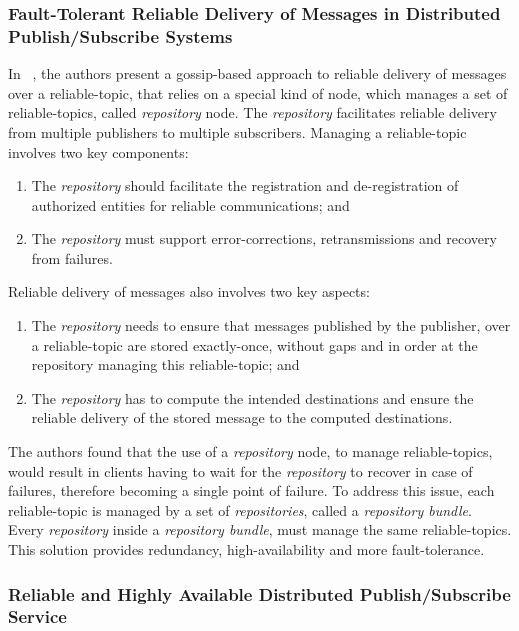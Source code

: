 \subsubsection{Fault-Tolerant Reliable Delivery of Messages in Distributed Publish/Subscribe Systems}
\label{sec:fault_tolerant_reliable_delivery}

In ~\cite{repository-nodes}, the authors present a gossip-based approach to reliable delivery of messages over a reliable-topic, that relies on a special kind of node, which manages a set of reliable-topics, called \textit{repository} node. The \textit{repository} facilitates reliable delivery from multiple publishers to multiple subscribers. Managing a reliable-topic involves two key components:
\begin{enumerate}
  \item The \textit{repository} should facilitate the registration and de-registration of authorized entities for reliable communications; and
  \item The \textit{repository} must support error-corrections, retransmissions and recovery from failures.
\end{enumerate}

Reliable delivery of messages also involves two key aspects:
\begin{enumerate}
  \item The \textit{repository} needs to ensure that messages published by the publisher, over a reliable-topic are stored exactly-once, without gaps and in order at the repository managing this reliable-topic; and
  \item The \textit{repository} has to compute the intended destinations and ensure the reliable delivery of the stored message to the computed destinations.
\end{enumerate}

The authors found that the use of a \textit{repository} node, to manage reliable-topics, would result in clients having to wait for the \textit{repository} to recover in case of failures, therefore becoming a single point of failure. To address this issue, each reliable-topic is managed by a set of \textit{repositories}, called a \textit{repository bundle}. Every \textit{repository} inside a \textit{repository bundle}, must manage the same reliable-topics. This solution provides redundancy, high-availability and more fault-tolerance.

\subsubsection{Reliable and Highly Available Distributed Publish/Subscribe Service}
\label{sec:reliable_and_highly_available_distributed_pubsub}

